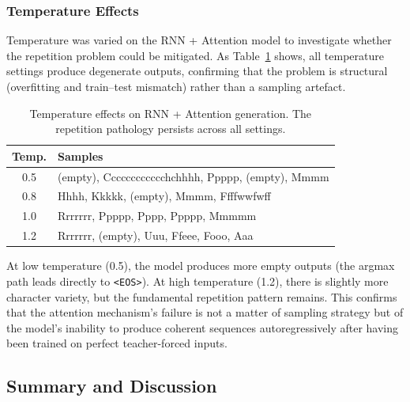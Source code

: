 \documentclass[12pt, a4paper]{article}
\begin{document}
\subsubsection{Temperature Effects}

Temperature was varied on the RNN + Attention model to investigate whether the repetition problem could be mitigated. As Table~\ref{tab:temp_effect} shows, all temperature settings produce degenerate outputs, confirming that the problem is structural (overfitting and train--test mismatch) rather than a sampling artefact.

\begin{table}[H]
\centering
\caption{Temperature effects on RNN + Attention generation. The repetition pathology persists across all settings.}
\label{tab:temp_effect}
\small
\begin{tabular}{cp{9cm}}
\toprule
\textbf{Temp.} & \textbf{Samples} \\
\midrule
0.5 & (empty), Cccccccccccchchhhh, Ppppp, (empty), Mmmm \\
0.8 & Hhhh, Kkkkk, (empty), Mmmm, Ffffwwfwff \\
1.0 & Rrrrrrr, Ppppp, Pppp, Ppppp, Mmmmm \\
1.2 & Rrrrrrr, (empty), Uuu, Ffeee, Fooo, Aaa \\
\bottomrule
\end{tabular}
\end{table}

At low temperature (0.5), the model produces more empty outputs (the argmax path leads directly to \texttt{<EOS>}). At high temperature (1.2), there is slightly more character variety, but the fundamental repetition pattern remains. This confirms that the attention mechanism's failure is not a matter of sampling strategy but of the model's inability to produce coherent sequences autoregressively after having been trained on perfect teacher-forced inputs.

\subsection{Summary and Discussion}
\end{document}
